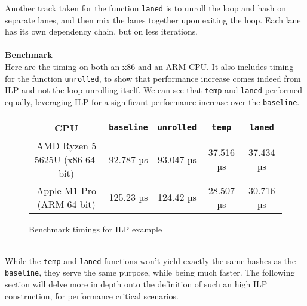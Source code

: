 \documentclass[11pt]{article}
\begin{document}
Another track taken for the function \texttt{laned} is to unroll the loop and hash on separate lanes, and then mix the lanes together upon exiting the loop. Each lane has its own dependency chain, but on less iterations.
\\\\
\textbf{Benchmark}\\
Here are the timing on both an x86 and an ARM CPU. It also includes timing for the function \texttt{unrolled}, to show that performance increase comes indeed from ILP and not the loop unrolling itself.
We can see that \texttt{temp} and \texttt{laned} performed equally, leveraging ILP for a significant performance increase over the \texttt{baseline}.
\\
\begin{figure}[h]
    \centering  %
    \begin{tabular}{|c|c|c|c|c|}
        \hline
        CPU & \texttt{baseline} & \texttt{unrolled} & \texttt{temp} & \texttt{laned} \\
        \hline
        AMD Ryzen 5 5625U (x86 64-bit) & 92.787 µs & 93.047 µs & 37.516 µs & 37.434 µs \\
        Apple M1 Pro (ARM 64-bit) & 125.23 µs & 124.42 µs & 28.507 µs & 30.716 µs \\
        \hline
    \end{tabular}
    \caption{Benchmark timings for ILP example}
    \label{tab:your_table_label}
\end{figure}
\\
While the \texttt{temp} and \texttt{laned} functions won't yield exactly the same hashes as the \texttt{baseline}, they serve the same purpose, while being much faster. The following section will delve more in depth onto the definition of such an high ILP construction, for performance critical scenarios.
\end{document}
